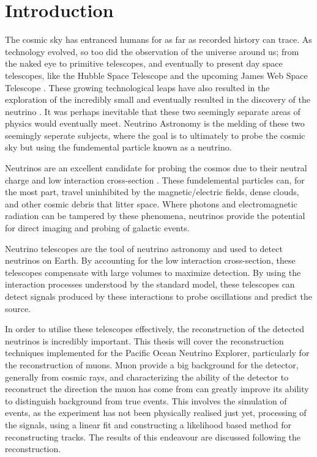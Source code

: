 \chapter{Introduction}

The cosmic sky has entranced humans for as far as recorded history can trace. As technology evolved, so too did the observation of the universe around us; from the naked eye to primitive telescopes, and eventually to present day space telescopes, like the Hubble Space Telescope and the upcoming James Web Space Telescope \cite{jwst}. These growing technological leaps have also resulted in the exploration of the incredibly small and eventually resulted in the discovery of the neutrino \cite{aneut}. It was perhaps inevitable that these two seemingly separate areas of physics would eventually meet. Neutrino Astronomy is the melding of these two seemingly seperate subjects, where the goal is to ultimately to probe the cosmic sky but using the fundemental particle known as a neutrino.

Neutrinos are an excellent candidate for probing the cosmos due to their neutral charge and low interaction cross-section \cite{pdg}. These fundelemental particles can, for the most part, travel uninhibited by the magnetic/electric fields, dense clouds, and other cosmic debris that litter space. Where photons and electromagnetic radiation can be tampered by these phenomena, neutrinos provide the potential for direct imaging and probing of galactic events. 

Neutrino telescopes are the tool of neutrino astronomy and used to detect neutrinos on Earth. By accounting for the low interaction cross-section, these telescopes compensate with large volumes to maximize detection. By using the interaction processes understood by the standard model, these telescopes can detect signals produced by these interactions to probe oscillations and predict the source. 

In order to utilise these telescopes effectively, the reconstruction of the detected neutrinos is incredibly important. This thesis will cover the reconstruction techniques implemented for the Pacific Ocean Neutrino Explorer, particularly for the reconstruction of muons. Muon provide a big background for the detector, generally from cosmic rays, and characterizing the ability of the detector to reconstruct the direction the muon has come from can greatly improve its ability to distinguish background from true events. This involves the simulation of events, as the experiment has not been physically realised just yet, processing of the signals, using a linear fit and constructing a likelihood based method for reconstructing tracks. The results of this endeavour are discussed following the reconstruction.









